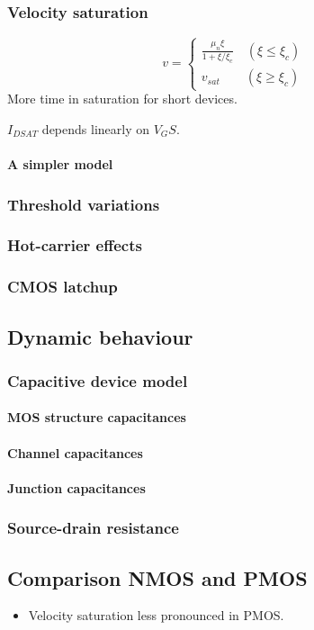 \documentclass{report}
\begin{document}
\subsubsection{Velocity saturation}
\[ v = \begin{cases}
\frac{\mu_n \xi}{1 + \xi/\xi_c} \quad (\xi \leq \xi_c) \\
v_{sat} \qquad (\xi \geq \xi_c)
\end{cases} \]
More time in saturation for short devices.

$I_{DSAT}$ depends linearly on $V_GS$.

\paragraph{A simpler model}
\subsubsection{Threshold variations}
\subsubsection{Hot-carrier effects}
\subsubsection{CMOS latchup}
\subsection{Dynamic behaviour}
\subsubsection{Capacitive device model}
\paragraph{MOS structure capacitances}
\paragraph{Channel capacitances}
\paragraph{Junction capacitances}
\subsubsection{Source-drain resistance}

\subsection{Comparison NMOS and PMOS}
\begin{itemize}
\item Velocity saturation less pronounced in PMOS.
\end{itemize}
\end{document}
